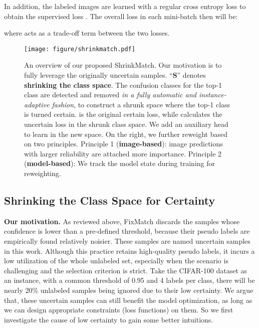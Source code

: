 \documentclass[10pt,twocolumn,letterpaper]{article}
\begin{document}
In addition, the labeled images are learned with a regular cross entropy loss to obtain the supervised loss . The overall loss in each mini-batch then will be:
\vspace{-2mm}

where  acts as a trade-off term between the two losses.


\begin{figure*}[t]
    \centering
    \texttt{[image: figure/shrinkmatch.pdf]}
    \vspace{-2mm}
    \caption{An overview of our proposed ShrinkMatch. Our motivation is to fully leverage the originally uncertain samples. ``\textbf{S}'' denotes \textbf{shrinking the class space}. The confusion classes for the top-1 class are detected and removed \emph{in a fully automatic and instance-adaptive fashion}, to construct a shrunk space where the top-1 class is turned certain.  is the original certain loss, while  calculates the uncertain loss in the shrunk class space. We add an auxiliary head  to learn in the new space. On the right, we further reweight  based on two principles. Principle 1 (\textbf{image-based}): image predictions with larger reliability are attached more importance. Principle 2 (\textbf{model-based}): We track the model state during training for reweighting.}
    \vspace{-2mm}
    \label{fig:shrinkmatch}
\end{figure*}

\subsection{\label{sec:shrink}Shrinking the Class Space for Certainty}

\noindent
\textbf{Our motivation.}
As reviewed above, FixMatch discards the samples whose confidence is lower than a pre-defined threshold, because their pseudo labels are empirically found relatively noisier. These samples are named uncertain samples in this work. Although this practice retains high-quality pseudo labels, it incurs a low utilization of the whole unlabeled set, especially when the scenario is challenging and the selection criterion is strict. Take the CIFAR-100 dataset as an instance, with a common threshold of 0.95 and 4 labels per class, there will be nearly 20\% unlabeled samples being ignored due to their low certainty. We argue that, these uncertain samples can still benefit the model optimization, as long as we can design appropriate constraints (loss functions) on them. So we first investigate the cause of low certainty to gain some better intuitions.
\end{document}
